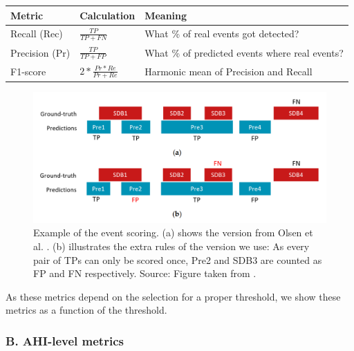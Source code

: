 \renewcommand{\arraystretch}{1.5}
\begin{table}[h!]
    \centering
    \begin{tabular}{p{1.6cm} p{2cm} p{4.4cm}}
        Metric & Calculation & Meaning \\
        \hline
        Recall \newline (Rec) & $\frac{TP}{TP+FN}$ & What \% of real events \newline got detected? \\
        Precision \newline (Pr) & $\frac{TP}{TP+FP}$ & What \% of predicted events \newline where real events? \\
        F1-score & $2 * \frac{Pr * Re}{Pr + Re}$ & Harmonic mean of \newline Precision and Recall \\
    \end{tabular}
\end{table}

\begin{figure}
    \centering
    \includegraphics[width=\textwidth]{images/EventScoring}
    \caption{Example of the event scoring. (a) shows the version from Olsen et al. \cite{olsen2020robust}. (b) illustrates the extra rules of the version we use: As every pair of TPs can only be scored once, Pre2 and SDB3 are counted as FP and FN respectively. Source: Figure taken from \cite{xie2023use}.}
    \label{fig:eventscoring}
\end{figure}

As these metrics depend on the selection for a proper threshold, we  show these metrics as a function of the threshold.

\subsubsection*{B. AHI-level metrics}

